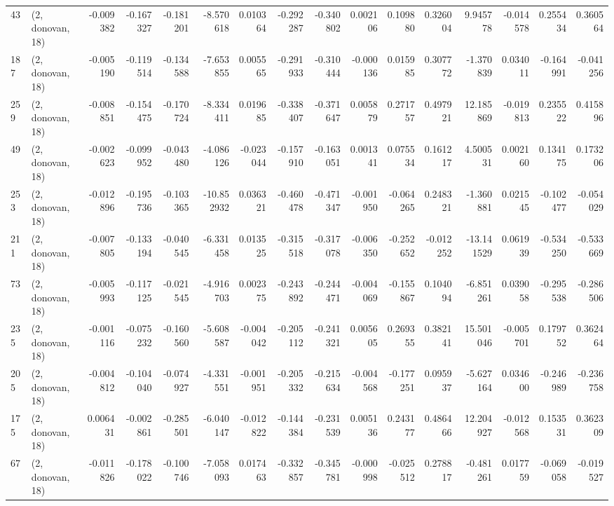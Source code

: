 \begin{tabular}{llrrrrrrrrrrrrrr}
43  &  (2, donovan, 18) &  -0.009382 & -0.167327 & -0.181201 &   -8.570618 &  0.010364 &  -0.292287 & -0.340802 &  0.002106 &  0.109880 &  0.326004 &     9.945778 & -0.014578 &  0.255434 &  0.360564 \\
187 &  (2, donovan, 18) &  -0.005190 & -0.119514 & -0.134588 &   -7.653855 &  0.005565 &  -0.291933 & -0.310444 & -0.000136 &  0.015985 &  0.307772 &    -1.370839 &  0.034011 & -0.164991 & -0.041256 \\
259 &  (2, donovan, 18) &  -0.008851 & -0.154475 & -0.170724 &   -8.334411 &  0.019685 &  -0.338407 & -0.371647 &  0.005879 &  0.271757 &  0.497921 &    12.185869 & -0.019813 &  0.235522 &  0.415896 \\
49  &  (2, donovan, 18) &  -0.002623 & -0.099952 & -0.043480 &   -4.086126 & -0.023044 &  -0.157910 & -0.163051 &  0.001341 &  0.075534 &  0.161217 &     4.500531 &  0.002160 &  0.134175 &  0.173206 \\
253 &  (2, donovan, 18) &  -0.012896 & -0.195736 & -0.103365 &  -10.852932 &  0.036321 &  -0.460478 & -0.471347 & -0.001950 & -0.064265 &  0.248321 &    -1.360881 &  0.021545 & -0.102477 & -0.054029 \\
211 &  (2, donovan, 18) &  -0.007805 & -0.133194 & -0.040545 &   -6.331458 &  0.013525 &  -0.315518 & -0.317078 & -0.006350 & -0.252652 & -0.012252 &   -13.141529 &  0.061939 & -0.534250 & -0.533669 \\
73  &  (2, donovan, 18) &  -0.005993 & -0.117125 & -0.021545 &   -4.916703 &  0.002375 &  -0.243892 & -0.244471 & -0.004069 & -0.155867 &  0.104094 &    -6.851261 &  0.039058 & -0.295538 & -0.286506 \\
235 &  (2, donovan, 18) &  -0.001116 & -0.075232 & -0.160560 &   -5.608587 & -0.004042 &  -0.205112 & -0.241321 &  0.005605 &  0.269355 &  0.382141 &    15.501046 & -0.005701 &  0.179752 &  0.362464 \\
205 &  (2, donovan, 18) &  -0.004812 & -0.104040 & -0.074927 &   -4.331551 & -0.001951 &  -0.205332 & -0.215634 & -0.004568 & -0.177251 &  0.095937 &    -5.627164 &  0.034600 & -0.246989 & -0.236758 \\
175 &  (2, donovan, 18) &   0.006431 & -0.002861 & -0.285501 &   -6.040147 & -0.012822 &  -0.144384 & -0.231539 &  0.005136 &  0.243177 &  0.486466 &    12.204927 & -0.012568 &  0.153531 &  0.362309 \\
67  &  (2, donovan, 18) &  -0.011826 & -0.178022 & -0.100746 &   -7.058093 &  0.017463 &  -0.332857 & -0.345781 & -0.000998 & -0.025512 &  0.278817 &    -0.481261 &  0.017759 & -0.069058 & -0.019527 \\

\end{tabular}
